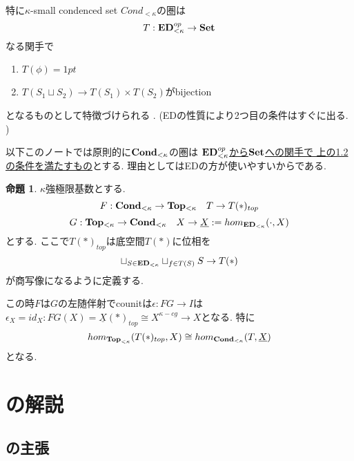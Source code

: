 \documentclass[dvipdfmx,a4paper,11pt]{article}
\theoremstyle{definition}
\newtheorem{prop}[thm]{命題}
\begin{document}
特に$\kappa$-small condenced set $Cond_{<\kappa}$の圏は
$$
T : {\bf ED}_{< \kappa}^{op} \to {\bf Set}
$$
なる関手で
\begin{enumerate}
\item $T(\phi) = 1pt$
\item $T(S_1 \sqcup S_2) \to T(S_1) \times T(S_2)$がbijection
\end{enumerate}
となるものとして特徴づけられる .
(EDの性質により2つ目の条件はすぐに出る. )

以下このノートでは原則的に${ \bf Cond}_{<\kappa}$の圏は
\underline{${\bf ED}_{< \kappa}^{op}$から${\bf Set}$への関手で 
上の1.2の条件を満たすもの}とする. 理由としてはEDの方が使いやすいからである.


\begin{tcolorbox}
 [colback = white, colframe = green!35!black, fonttitle = \bfseries,breakable = true]
\begin{prop}\cite[proposition 1.7]{Sch19}
$\kappa$強極限基数とする. 
$$
F : {\bf Cond}_{< \kappa} \to {\bf Top_{<\kappa}} \quad T \to T(\ast)_{top}
$$
$$
G :  {\bf Top_{<\kappa}} \to {\bf Cond}_{< \kappa} \quad X \to \underline{X}:=hom_{{\bf ED}_{<\kappa}}(\cdot, X)
$$
とする. 
ここで$T(\ast)_{top}$は底空間$T(\ast)$に位相を
$$
\sqcup_{S \in {\bf ED}_{<\kappa}}  \sqcup_{f \in T(S) }  S \to T(\ast)
$$
が商写像になるように定義する.

この時$F$は$G$の左随伴射でcounitは$\epsilon : FG \to I$は$\epsilon_{X}=id_{X}: FG(X)=\underline{X}(\ast)_{top}\cong X^{\kappa-cg} \to X$となる. 
特に
$$
hom_{{\bf Top}_{<\kappa}}(T(\ast)_{top}, X) \cong hom_{{\bf Cond}_{<\kappa}}(T, \underline{X})
$$
となる. 
 \end{prop}
 \end{tcolorbox}



\section{\cite[Proposition 2.9]{Sch19}の解説}



\subsection{\cite[Proposition 2.9]{Sch19}の主張}
\end{document}
